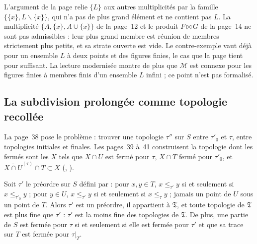 \begin{remarque}
L'argument de la page relie $\{L\}$ aux autres multiplicités par la famille $\{\{x\}, L \smallsetminus \{x\}\}$, qui n'a pas de plus grand élément et ne contient pas $L$. La multiplicité $\{A, \{x\}, A \cup \{x\}\}$ de la page~12 et le produit $F \boxtimes G$ de la page~14 ne sont pas admissibles : leur plus grand membre est réunion de membres strictement plus petits, et sa strate ouverte est vide. Le contre-exemple vaut déjà pour un ensemble $L$ à deux points et des figures finies, le cas que la page tient pour suffisant. La lecture modernisée montre de plus que $\mathcal M$ est connexe pour les figures finies à membres finis d'un ensemble $L$ infini ; ce point n'est pas formalisé.
\end{remarque}

\subsection*{La subdivision prolongée comme topologie recollée}

La page~38 pose le problème : trouver une topologie $\tau''$ sur $S$ entre $\tau'_0$ et $\tau$,  entre topologies initiales et finales. Les pages~39 à~41 construisent la topologie dont les fermés sont les $X$ tels que $X \cap U$ est fermé pour $\tau$, $X \cap T$ fermé pour $\tau'_0$, et $\overline{X \cap U}^{(\tau)} \cap T \subset X$ (, ).

\begin{encadre}
\begin{theoreme}
Soit $\tau'$ le préordre sur $S$ défini par : pour $x, y \in T$, $x \leq_{\tau'} y$ si et seulement si $x \leq_{\tau'_0} y$ ; pour $y \in U$, $x \leq_{\tau'} y$ si et seulement si $x \leq_\tau y$ ; jamais un point de $U$ sous un point de $T$. Alors $\tau'$ est un préordre, il appartient à $\mathfrak T$, et toute topologie de $\mathfrak T$ est plus fine que $\tau'$ : $\tau'$ est la moins fine des topologies de $\mathfrak T$. De plus, une partie de $S$ est fermée pour $\tau$ si et seulement si elle est fermée pour $\tau'$ et que sa trace sur $T$ est fermée pour $\tau|_T$.
\end{theoreme}
\end{encadre}

